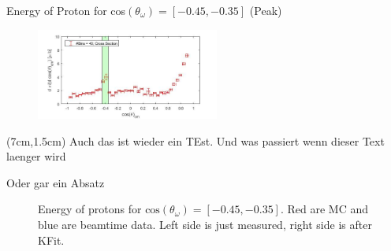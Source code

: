 \documentclass[
		10pt
		]{beamer}
\begin{document}
\begin{frame}{Energy of Proton for cos$(\theta_{\omega})=[-0.45,-0.35]$ (Peak)}

	
	\begin{figure}
		\hspace{-5.9cm}  \vspace{-1cm}
		\includegraphics[width=6cm]{Plots/6}
	\end{figure}



\begin{textblock*}{5.5cm}(7cm,1.5cm)
	\small
	Auch das ist wieder ein TEst. Und was passiert wenn dieser Text laenger wird
	
	Oder gar ein Absatz
\end{textblock*}



\begin{figure}%
	\begin{center}

	\qquad
	
	\captionsetup{labelformat=empty}	
	\caption{Energy of protons for $\textrm{cos}(\theta_{\omega}) = [-0.45, -0.35] $. Red are MC and blue are beamtime data. Left side is just measured, right side is after KFit.}%
	
\end{center}
	
\end{figure}





	
\end{frame}
\end{document}
